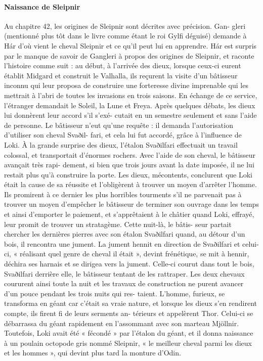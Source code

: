 \documentclass[a4paper,12pt]{article}
\begin{document}
\paragraph{Naissance de Sleipnir}
Au chapitre 42, les origines de Sleipnir sont décrites avec précision. Gan-
gleri (mentionné plus tôt dans le livre comme étant le roi Gylfi déguisé)
demande à Hár d’où vient le cheval Sleipnir et ce qu’il peut lui en apprendre.
Hár est surpris par le manque de savoir de Gangleri à propos des origines de
Sleipnir, et raconte l’histoire comme suit : au début, à l’arrivée des dieux,
lorsque ceux-ci eurent établit Midgard et construit le Valhalla, ils reçurent
la visite d’un bâtisseur inconnu qui leur proposa de construire une forteresse
divine imprenable qui les mettrait à l’abri de toutes les invasions en trois
saisons. En échange de ce service, l’étranger demandait le Soleil, la Lune et
Freya. Après quelques débats, les dieux lui donnèrent leur accord s’il s’exé-
cutait en un semestre seulement et sans l’aide de personne. Le bâtisseur
n’eut qu’une requête : il demanda l’autorisation d’utiliser son cheval Svaðil-
fari, et cela lui fut accordé, grâce à l’influence de Loki. À la grande surprise
des dieux, l’étalon Svaðilfari effectuait un travail colossal, et transportait
d’énormes rochers. Avec l’aide de son cheval, le bâtisseur avançait très rapi-
dement, si bien que trois jours avant la date imposée, il ne lui restait plus
qu’à construire la porte. Les dieux, mécontents, conclurent que Loki était la
cause de sa réussite et l’obligèrent à trouver un moyen d’arrêter l’homme.
Ils promirent à ce dernier les plus horribles tourments s’il ne parvenait pas
à trouver un moyen d’empêcher le bâtisseur de terminer son ouvrage dans
les temps et ainsi d’emporter le paiement, et s’apprêtaient à le châtier quand
Loki, effrayé, leur promit de trouver un stratagème. Cette nuit-là, le bâtis-
seur partait chercher les dernières pierres avec son étalon Svaðilfari quand,
au détour d’un bois, il rencontra une jument. La jument hennit en direction
de Svaðilfari et celui-ci, « réalisant quel genre de cheval il était », devint
frénétique, se mit à hennir, déchira ses harnais et se dirigea vers la jument.
Celle-ci courut dans tout le bois, Svaðilfari derrière elle, le bâtisseur tentant
de les rattraper. Les deux chevaux coururent ainsi toute la nuit et les travaux
de construction ne purent avancer d’un pouce pendant les trois nuits qui res-
taient. L’homme, furieux, se transforma en géant car c’était sa vraie nature,
et lorsque les dieux s’en rendirent compte, ils firent fi de leurs serments an-
térieurs et appelèrent Thor. Celui-ci se débarrassa du géant rapidement en
l’assommant avec son marteau Mjöllnir. Toutefois, Loki avait été « fécondé
» par l’étalon du géant, et il donna naissance à un poulain octopode gris
nommé Sleipnir, « le meilleur cheval parmi les dieux et les hommes », qui
devint plus tard la monture d’Odin.
\end{document}
